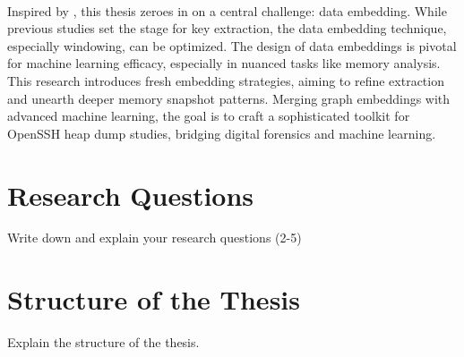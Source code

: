 \paragraph*{}Inspired by , this thesis zeroes in on a central challenge: data embedding. While previous studies set the stage for key extraction, the data embedding technique, especially windowing, can be optimized. The design of data embeddings is pivotal for machine learning efficacy, especially in nuanced tasks like memory analysis. This research introduces fresh embedding strategies, aiming to refine extraction and unearth deeper memory snapshot patterns. Merging graph embeddings with advanced machine learning, the goal is to craft a sophisticated toolkit for OpenSSH heap dump studies, bridging digital forensics and machine learning.


\section{Research Questions}

Write down and explain your research questions (2-5)

\section{Structure of the Thesis}

Explain the structure of the thesis. 
